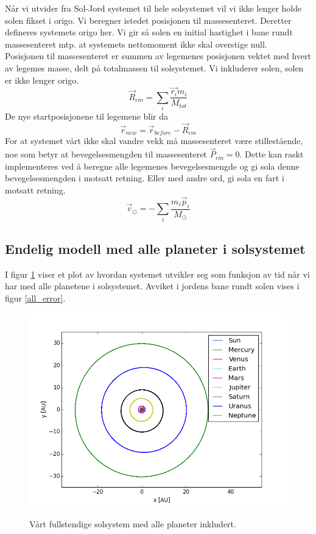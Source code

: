 \documentclass[11pt,a4paper]{article}
\begin{document}
Når vi utvider fra Sol-Jord systemet til hele solsystemet vil vi ikke lenger holde solen fikset i origo. Vi beregner istedet posisjonen til massesenteret. Deretter defineres systemets origo her. Vi gir så solen en initial hastighet i bane rundt massesenteret 
mtp. at systemets nettomoment ikke skal overstige null.	\\

Posisjonen til massesenteret er summen av legemenes posisjonen vektet med hvert av legemes masse, delt på totalmassen til solsystemet. Vi inkluderer solen, solen er ikke lenger origo.
\begin{equation}
 \vec{R}_{cm} = \sum_i \frac{\vec{r_i}m_i}{M_{tot}}
\end{equation}
De nye startposisjonene til legemene blir da $$\vec{r}_{new} = \vec{r}_{before} - \vec{R}_{cm}$$
For at systemet vårt ikke skal vandre vekk må massesenteret være stillestående, noe som betyr at bevegelsesmengden til massesenteret $\vec{P}_{cm} = 0$.
Dette kan raskt implementeres ved å beregne alle legemenes bevegelsesmengde og gi sola denne bevegelsesmengden i motsatt retning. Eller med andre ord, gi sola en fart i motsatt retning.
\begin{equation}
 \vec{v}_{\odot} = -\sum_i \frac{m_i\vec{p}_{i}}{M_{\odot}}
\end{equation}



\subsection{Endelig modell med alle planeter i solsystemet}
I figur \ref{all} viser et plot av hvordan systemet utvikler seg som funksjon av tid når vi har med alle planetene i solsystemet. Avviket i jordens bane rundt solen vises i figur \ref{all_error}. 

\FloatBarrier
\begin{figure}[!ht]
\begin{center}
  \includegraphics[width = 120mm]{3f_all.png}\\
  \caption{Vårt fullstendige solsystem med alle planeter inkludert.}   \label{all}
  \end{center}
  \end{figure}
\FloatBarrier
\end{document}
